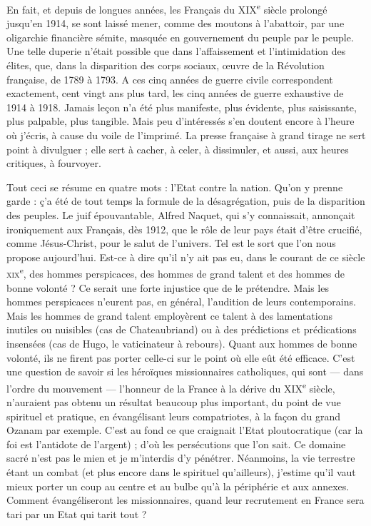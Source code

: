 \documentclass[french,twoside]{book} %
\begin{document}
En fait, et depuis de longues années, les Français du XIX\textsuperscript{e} siècle prolongé jusqu’en 1914, se sont laissé mener, comme des moutons à l’abattoir, par une oligarchie financière sémite, masquée en gouvernement du peuple par le peuple. Une telle duperie n’était possible que dans l’affaissement et l’intimidation des élites, que, dans la disparition des corps sociaux, œuvre de la Révolution française, de 1789 à 1793. A ces cinq années de guerre civile correspondent exactement, cent vingt ans plus tard, les cinq années de guerre exhaustive de 1914 à 1918. Jamais leçon n’a été plus manifeste, plus évidente, plus saisissante, plus palpable, plus tangible. Mais peu d’intéressés s’en doutent encore à l’heure où j’écris, à cause du voile de l’imprimé. La presse française à grand tirage ne sert point à divulguer ; elle sert à cacher, à celer, à dissimuler, et aussi, aux heures critiques, à fourvoyer.\par
Tout ceci se résume en quatre mots : l’Etat contre la nation. Qu’on y prenne garde : ç’a été de tout temps la formule de la désagrégation, puis de la disparition des peuples. Le juif épouvantable, Alfred Naquet, qui s’y connaissait, annonçait ironiquement aux Français, dès 1912, que le rôle de leur pays était d’être crucifié, comme Jésus-Christ, pour le salut de l’univers. Tel est le sort que l’on nous propose aujourd’hui. Est-ce à dire qu’il n’y ait pas eu, dans le courant de ce siècle \textsc{xix}\textsuperscript{e}, des hommes perspicaces, des hommes de grand talent et des hommes de bonne volonté ? Ce serait une forte injustice que de le prétendre. Mais les hommes perspicaces n’eurent pas, en général, l’audition de leurs contemporains. Mais les hommes de grand talent employèrent ce talent à des lamentations inutiles ou nuisibles (cas de Chateaubriand) ou à des prédictions et prédications insensées (cas de Hugo, le vaticinateur à rebours). Quant aux hommes de bonne volonté, ils ne firent pas porter celle-ci sur le point où elle eût été efficace. C’est une question de savoir si les héroïques missionnaires catholiques, qui sont — dans l’ordre du mouvement — l’honneur de la France à la dérive du XIX\textsuperscript{e} siècle, n’auraient pas obtenu un résultat beaucoup plus important, du point de vue spirituel et pratique, en évangélisant leurs compatriotes, à la façon du grand Ozanam par exemple. C’est au fond ce que craignait l’Etat ploutocratique (car la foi est l’antidote de l’argent) ; d’où les persécutions que l’on sait. Ce domaine sacré n’est pas le mien et je m’interdis d’y pénétrer. Néanmoins, la vie terrestre étant un combat (et plus encore dans le spirituel qu’ailleurs), j’estime qu’il vaut mieux porter un coup au centre et au bulbe qu’à la périphérie et aux annexes. Comment évangéliseront les missionnaires, quand leur recrutement en France sera tari par un Etat qui tarit tout ?\par
\end{document}
